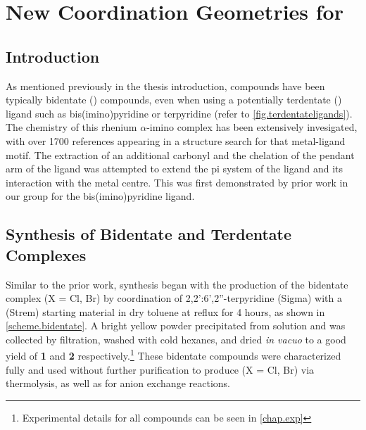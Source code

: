 \chapter{New Coordination Geometries for \texorpdfstring{}{Rhenium (I)}}
\section{Introduction}

As mentioned previously in the thesis introduction,  compounds have been typically bidentate () compounds, even when using a potentially terdentate () ligand such as bis(imino)pyridine or terpyridine (refer to \autoref{fig.terdentateligands}). The chemistry of this rhenium $\alpha$-imino complex has been extensively invesigated, with over 1700 references appearing in a structure search for that metal-ligand motif. The extraction of an additional carbonyl and the chelation of the pendant arm of the ligand was attempted to extend the pi system of the ligand and its interaction with the metal centre. This was first demonstrated by prior work in our group for the bis(imino)pyridine ligand\autocite{jurca2013}. 

\section{Synthesis of Bidentate and Terdentate \texorpdfstring{}{Rhenium (I)} Complexes}

Similar to the prior work, synthesis began with the production of the bidentate complex  (X = Cl, Br) by coordination of 2,2':6',2''-terpyridine (Sigma) with a  (Strem) starting material in dry toluene at reflux for 4 hours, as shown in \autoref{scheme.bidentate}. A bright yellow powder precipitated from solution and was collected by filtration, washed with cold hexanes, and dried \textit{in vacuo} to a good yield of \textbf{1} and \textbf{2} respectively.\footnote{Experimental details for all compounds can be seen in \autoref{chap.exp} } These bidentate compounds were characterized fully and used without further purification to produce  (X = Cl, Br) via thermolysis, as well as for anion exchange reactions. 

